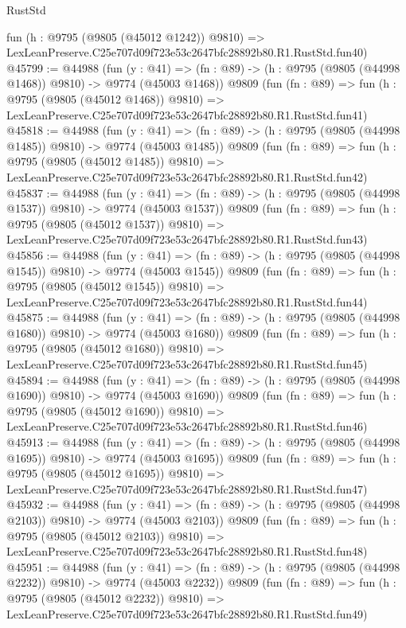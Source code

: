 \begin{lexlean}{RustStd}
\begin{coremodule}
    fun (h : @9795 (@9805 (@45012 @1242)) @9810) =>
    LexLeanPreserve.C25e707d09f723e53c2647bfc28892b80.R1.RustStd.fun40)
@45799 := @44988
    (fun (y : @41) =>
    (fn : @89) -> (h : @9795 (@9805 (@44998 @1468)) @9810) -> @9774 (@45003 @1468))
    @9809
    (fun (fn : @89) =>
    fun (h : @9795 (@9805 (@45012 @1468)) @9810) =>
    LexLeanPreserve.C25e707d09f723e53c2647bfc28892b80.R1.RustStd.fun41)
@45818 := @44988
    (fun (y : @41) =>
    (fn : @89) -> (h : @9795 (@9805 (@44998 @1485)) @9810) -> @9774 (@45003 @1485))
    @9809
    (fun (fn : @89) =>
    fun (h : @9795 (@9805 (@45012 @1485)) @9810) =>
    LexLeanPreserve.C25e707d09f723e53c2647bfc28892b80.R1.RustStd.fun42)
@45837 := @44988
    (fun (y : @41) =>
    (fn : @89) -> (h : @9795 (@9805 (@44998 @1537)) @9810) -> @9774 (@45003 @1537))
    @9809
    (fun (fn : @89) =>
    fun (h : @9795 (@9805 (@45012 @1537)) @9810) =>
    LexLeanPreserve.C25e707d09f723e53c2647bfc28892b80.R1.RustStd.fun43)
@45856 := @44988
    (fun (y : @41) =>
    (fn : @89) -> (h : @9795 (@9805 (@44998 @1545)) @9810) -> @9774 (@45003 @1545))
    @9809
    (fun (fn : @89) =>
    fun (h : @9795 (@9805 (@45012 @1545)) @9810) =>
    LexLeanPreserve.C25e707d09f723e53c2647bfc28892b80.R1.RustStd.fun44)
@45875 := @44988
    (fun (y : @41) =>
    (fn : @89) -> (h : @9795 (@9805 (@44998 @1680)) @9810) -> @9774 (@45003 @1680))
    @9809
    (fun (fn : @89) =>
    fun (h : @9795 (@9805 (@45012 @1680)) @9810) =>
    LexLeanPreserve.C25e707d09f723e53c2647bfc28892b80.R1.RustStd.fun45)
@45894 := @44988
    (fun (y : @41) =>
    (fn : @89) -> (h : @9795 (@9805 (@44998 @1690)) @9810) -> @9774 (@45003 @1690))
    @9809
    (fun (fn : @89) =>
    fun (h : @9795 (@9805 (@45012 @1690)) @9810) =>
    LexLeanPreserve.C25e707d09f723e53c2647bfc28892b80.R1.RustStd.fun46)
@45913 := @44988
    (fun (y : @41) =>
    (fn : @89) -> (h : @9795 (@9805 (@44998 @1695)) @9810) -> @9774 (@45003 @1695))
    @9809
    (fun (fn : @89) =>
    fun (h : @9795 (@9805 (@45012 @1695)) @9810) =>
    LexLeanPreserve.C25e707d09f723e53c2647bfc28892b80.R1.RustStd.fun47)
@45932 := @44988
    (fun (y : @41) =>
    (fn : @89) -> (h : @9795 (@9805 (@44998 @2103)) @9810) -> @9774 (@45003 @2103))
    @9809
    (fun (fn : @89) =>
    fun (h : @9795 (@9805 (@45012 @2103)) @9810) =>
    LexLeanPreserve.C25e707d09f723e53c2647bfc28892b80.R1.RustStd.fun48)
@45951 := @44988
    (fun (y : @41) =>
    (fn : @89) -> (h : @9795 (@9805 (@44998 @2232)) @9810) -> @9774 (@45003 @2232))
    @9809
    (fun (fn : @89) =>
    fun (h : @9795 (@9805 (@45012 @2232)) @9810) =>
    LexLeanPreserve.C25e707d09f723e53c2647bfc28892b80.R1.RustStd.fun49)

\end{coremodule}
\end{lexlean}
